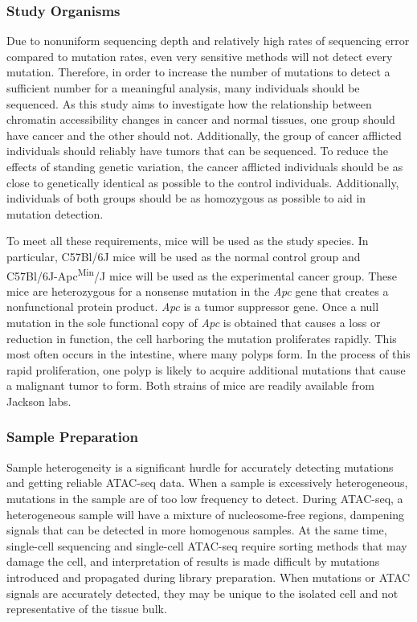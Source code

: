 \subsubsection{Study Organisms}
Due to nonuniform sequencing depth and relatively high rates of sequencing error compared to mutation rates, even very sensitive methods will not detect every mutation. Therefore, in order to increase the number of mutations to detect a sufficient number for a meaningful analysis, many individuals should be sequenced. As this study aims to investigate how the relationship between chromatin accessibility changes in cancer and normal tissues, one group should have cancer and the other should not.
Additionally, the group of cancer afflicted individuals should reliably have tumors that can be sequenced. To reduce the effects of standing genetic variation, the cancer afflicted individuals should be as close to genetically identical as possible to the control individuals. Additionally, individuals of both groups should be as homozygous as possible to aid in mutation detection.

To meet all these requirements, mice will be used as the study species. In particular, C57Bl/6J mice will be used as the normal control group and C57Bl/6J-Apc\textsuperscript{Min}/J mice will be used as the experimental cancer group. These mice are heterozygous for a nonsense mutation in the \textit{Apc} gene that creates a nonfunctional protein product. \textit{Apc} is a tumor suppressor gene. Once a null mutation in the sole functional copy of \textit{Apc} is obtained that causes a loss or reduction in function, the cell harboring the mutation proliferates rapidly. This most often occurs in the intestine, where many polyps form. In the process of this rapid proliferation, one polyp is likely to acquire additional mutations that cause a malignant tumor to form. Both strains of mice are readily available from Jackson labs.

\subsubsection{Sample Preparation}

Sample heterogeneity is a significant hurdle for accurately detecting mutations and getting reliable ATAC-seq data. When a sample is excessively heterogeneous, mutations in the sample are of too low frequency to detect. During ATAC-seq, a heterogeneous sample will have a mixture of nucleosome-free regions, dampening signals that can be detected in more homogenous samples. At the same time, single-cell sequencing and single-cell ATAC-seq require sorting methods that may damage the cell, and interpretation of results is made difficult by mutations introduced and propagated during library preparation. When mutations or ATAC signals are accurately detected, they may be unique to the isolated cell and not representative of the tissue bulk.

